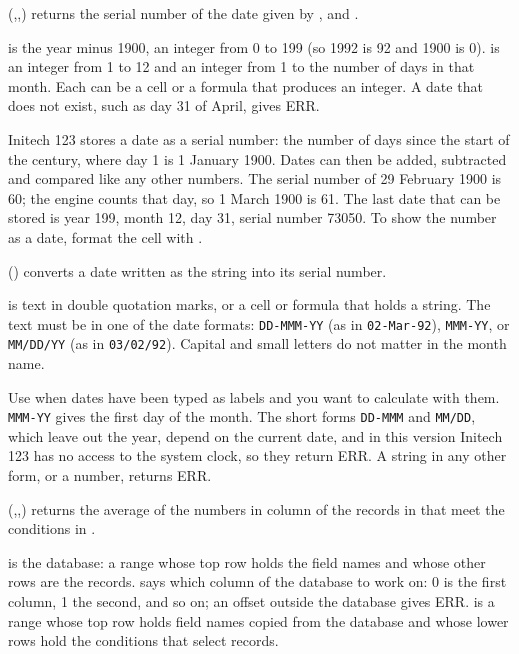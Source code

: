 \Examples
{}

(,,) returns the serial number of the date given by ,  and .

 is the year minus 1900, an integer from 0 to 199 (so 1992 is 92 and 1900 is 0).  is an integer from 1 to 12 and  an integer from 1 to the number of days in that month. Each can be a cell or a formula that produces an integer. A date that does not exist, such as day 31 of April, gives ERR.

Initech 123 stores a date as a serial number: the number of days since the start of the century, where day 1 is 1 January 1900. Dates can then be added, subtracted and compared like any other numbers. The serial number of 29 February 1900 is 60; the engine counts that day, so 1 March 1900 is 61. The last date that can be stored is year 199, month 12, day 31, serial number 73050. To show the number as a date, format the cell with .

\Examples
{}

() converts a date written as the string  into its serial number.

 is text in double quotation marks, or a cell or formula that holds a string. The text must be in one of the date formats: \texttt{DD-MMM-YY} (as in \texttt{02-Mar-92}), \texttt{MMM-YY}, or \texttt{MM/DD/YY} (as in \texttt{03/02/92}). Capital and small letters do not matter in the month name.

Use  when dates have been typed as labels and you want to calculate with them. \texttt{MMM-YY} gives the first day of the month. The short forms \texttt{DD-MMM} and \texttt{MM/DD}, which leave out the year, depend on the current date, and in this version Initech 123 has no access to the system clock, so they return ERR. A string in any other form, or a number, returns ERR.

\Examples
{}

(,,) returns the average of the numbers in column  of the records in  that meet the conditions in .

 is the database: a range whose top row holds the field names and whose other rows are the records.  says which column of the database to work on: 0 is the first column, 1 the second, and so on; an offset outside the database gives ERR.  is a range whose top row holds field names copied from the database and whose lower rows hold the conditions that select records.

